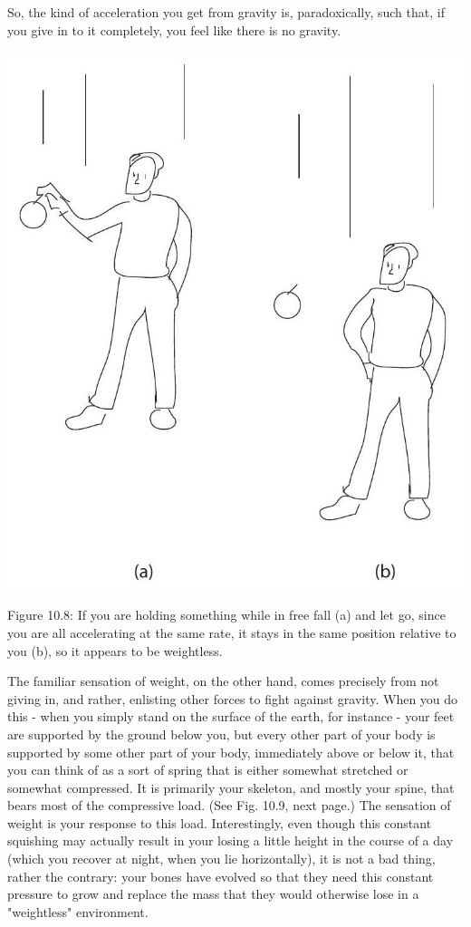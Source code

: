 \documentclass[10pt]{article}
\begin{document}
So, the kind of acceleration you get from gravity is, paradoxically, such that, if you give in to it completely, you feel like there is no gravity.

\begin{center}
\includegraphics[max width=\textwidth]{2024_09_14_9969b06773f10b6936e8g-255}
\end{center}

Figure 10.8: If you are holding something while in free fall (a) and let go, since you are all accelerating at the same rate, it stays in the same position relative to you (b), so it appears to be weightless.

The familiar sensation of weight, on the other hand, comes precisely from not giving in, and rather, enlisting other forces to fight against gravity. When you do this - when you simply stand on the surface of the earth, for instance - your feet are supported by the ground below you, but every other part of your body is supported by some other part of your body, immediately above or below it, that you can think of as a sort of spring that is either somewhat stretched or somewhat compressed. It is primarily your skeleton, and mostly your spine, that bears most of the compressive load. (See Fig. 10.9, next page.) The sensation of weight is your response to this load. Interestingly, even though this constant squishing may actually result in your losing a little height in the course of a day (which you recover at night, when you lie horizontally), it is not a bad thing, rather the contrary: your bones have evolved so that they need this constant pressure to grow and replace the mass that they would otherwise lose in a "weightless" environment.
\end{document}
